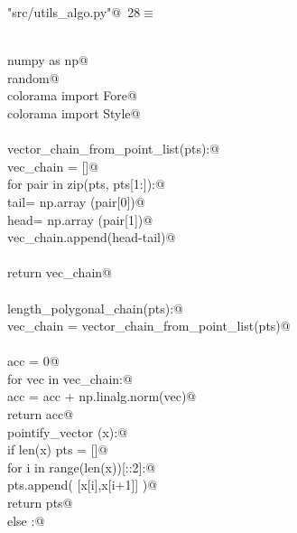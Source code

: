 \documentclass[10pt, english, oneside]{report}
\begin{document}
\begin{appendices}
\begin{flushleft} \small\label{scrap32}\raggedright\small
{} \verb@"src/utils_algo.py"@\nobreak\ {\footnotesize {28}}$\equiv$
\vspace{-1ex}
\begin{list}{}{} \item
\mbox{}\verb@@\\
\mbox{}\verb@import numpy as np@\\
\mbox{}\verb@import random@\\
\mbox{}\verb@from colorama import Fore@\\
\mbox{}\verb@from colorama import Style@\\
\mbox{}\verb@@\\
\mbox{}\verb@def vector_chain_from_point_list(pts):@\\
\mbox{}\verb@    vec_chain = []@\\
\mbox{}\verb@    for pair in zip(pts, pts[1:]):@\\
\mbox{}\verb@        tail= np.array (pair[0])@\\
\mbox{}\verb@        head= np.array (pair[1])@\\
\mbox{}\verb@        vec_chain.append(head-tail)@\\
\mbox{}\verb@@\\
\mbox{}\verb@    return vec_chain@\\
\mbox{}\verb@@\\
\mbox{}\verb@def length_polygonal_chain(pts):@\\
\mbox{}\verb@    vec_chain = vector_chain_from_point_list(pts)@\\
\mbox{}\verb@@\\
\mbox{}\verb@    acc = 0@\\
\mbox{}\verb@    for vec in vec_chain:@\\
\mbox{}\verb@        acc = acc + np.linalg.norm(vec)@\\
\mbox{}\verb@    return acc@\\
\mbox{}\verb@def pointify_vector (x):@\\
\mbox{}\verb@    if len(x) % 2 == 0:@\\
\mbox{}\verb@        pts = []@\\
\mbox{}\verb@        for i in range(len(x))[::2]:@\\
\mbox{}\verb@            pts.append( [x[i],x[i+1]] )@\\
\mbox{}\verb@        return pts@\\
\mbox{}\verb@    else :@\\

\end{list}
\end{flushleft}
\end{appendices}
\end{document}
